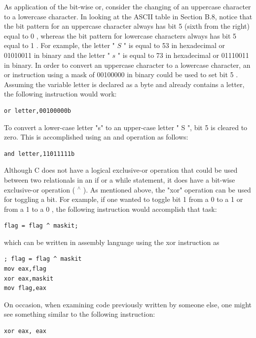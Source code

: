 \documentclass[10pt]{article}
\begin{document}
As application of the bit-wise or, consider the changing of an uppercase character to a lowercase character. In looking at the ASCII table in Section B.8, notice that the bit pattern for an uppercase character always has bit 5 (sixth from the right) equal to 0 , whereas the bit pattern for lowercase characters always has bit 5 equal to 1 . For example, the letter " $S$ " is equal to 53 in hexadecimal or 01010011 in binary and the letter " $s$ " is equal to 73 in hexadecimal or 01110011 in binary. In order to convert an uppercase character to a lowercase character, an or instruction using a mask of 00100000 in binary could be used to set bit 5 . Assuming the variable letter is declared as a byte and already contains a letter, the following instruction would work:

\begin{verbatim}
or letter,00100000b
\end{verbatim}

To convert a lower-case letter "s" to an upper-case letter " S ", bit 5 is cleared to zero. This is accomplished using an and operation as follows:

\begin{verbatim}
and letter,11011111b
\end{verbatim}

Although C does not have a logical exclusive-or operation that could be used between two relationals in an if or a while statement, it does have a bit-wise exclusive-or operation ( ${ }^{\wedge}$ ). As mentioned above, the "xor" operation can be used for toggling a bit. For example, if one wanted to toggle bit 1 from a 0 to a 1 or from a 1 to a 0 , the following instruction would accomplish that task:

\begin{verbatim}
flag = flag ^ maskit;
\end{verbatim}

which can be written in assembly language using the xor instruction as

\begin{verbatim}
; flag = flag ^ maskit
mov eax,flag
xor eax,maskit
mov flag,eax
\end{verbatim}

On occasion, when examining code previously written by someone else, one might see something similar to the following instruction:

\begin{verbatim}
xor eax, eax
\end{verbatim}
\end{document}
